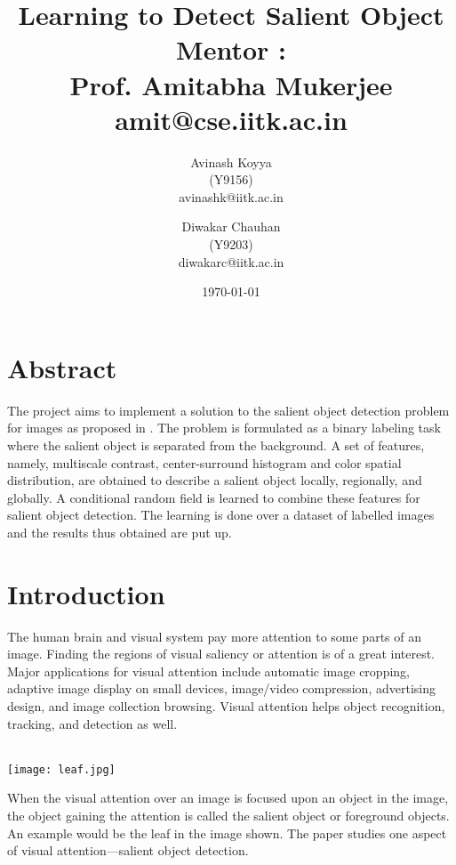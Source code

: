 \documentclass[11pt]{report}
\begin{document}
\author{ 
		Avinash  Koyya\\
			(Y9156) \\
		avinashk@iitk.ac.in
		\and	
	    Diwakar Chauhan\\
		    (Y9203)\\
		   diwakarc@iitk.ac.in
	    }
\title{{\bf Learning to Detect Salient Object}\\ \vspace{10pt}
			 { \normalsize {Mentor : \\ Prof. Amitabha Mukerjee \\ amit@cse.iitk.ac.in }}}
\date{\today}
\maketitle
\newpage

\section*{Abstract}

The project aims to implement a solution to the salient object detection problem for images as proposed in \cite{mainpaper}.
The problem is formulated as a binary labeling task where the salient object is separated from the background. A set of features, namely, multiscale contrast, center-surround histogram and color spatial distribution, are obtained to describe a salient object locally, regionally, and globally. 
A conditional random field is learned to combine these features for salient object detection.
The learning is done over a dataset of labelled images and the results thus obtained are put up.

\section*{Introduction}

The human brain and visual system pay more attention to some parts of an image. 
Finding the regions of visual saliency or attention is of a great interest.
Major applications for visual attention include automatic image cropping, adaptive image display on small devices, image/video compression, advertising design, and image collection browsing. 
Visual attention helps object recognition, tracking, and detection as well. \\ \\
\begin{minipage}{0.4\linewidth}
\texttt{[image: leaf.jpg]}
\end{minipage}
\begin{minipage}{0.5\linewidth}
When the visual attention over an image is focused upon an 
object in the image, the object gaining the attention 
 is called the salient object or foreground objects. An example would be the leaf in the image shown.
The paper \cite{mainpaper} studies one aspect of visual attention—salient object detection.\\
\end{minipage}\\
\end{document}
